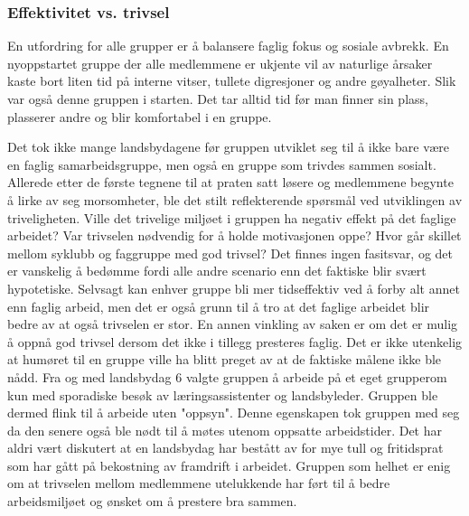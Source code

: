 \subsubsection{Effektivitet vs. trivsel}
En utfordring for alle grupper er å balansere faglig fokus og sosiale avbrekk.
En nyoppstartet gruppe der alle medlemmene er ukjente vil av naturlige årsaker kaste bort liten tid på interne vitser, tullete digresjoner og andre gøyalheter.
Slik var også denne gruppen i starten. Det tar alltid tid før man finner sin plass, plasserer andre og blir komfortabel i en gruppe. 

Det tok ikke mange landsbydagene før gruppen utviklet seg til å ikke bare være en faglig samarbeidsgruppe, men også en gruppe som trivdes sammen sosialt. 
Allerede etter de første tegnene til at praten satt løsere og medlemmene begynte å lirke av seg morsomheter, ble det stilt reflekterende spørsmål ved utviklingen av triveligheten.
Ville det trivelige miljøet i gruppen ha negativ effekt på det faglige arbeidet?
Var trivselen nødvendig for å holde motivasjonen oppe? 
Hvor går skillet mellom syklubb og faggruppe med god trivsel?
Det finnes ingen fasitsvar, og det er vanskelig å bedømme fordi alle andre scenario enn det faktiske blir svært hypotetiske.
Selvsagt kan enhver gruppe bli mer tidseffektiv ved å forby alt annet enn faglig arbeid, men det er også grunn til å tro at det faglige arbeidet blir bedre av at også trivselen er stor.
En annen vinkling av saken er om det er mulig å oppnå god trivsel dersom det ikke i tillegg presteres faglig.
Det er ikke utenkelig at humøret til en gruppe ville ha blitt preget av at de faktiske målene ikke ble nådd.
Fra og med landsbydag 6 valgte gruppen å arbeide på et eget grupperom kun med sporadiske besøk av læringsassistenter og landsbyleder.
Gruppen ble dermed flink til å arbeide uten "oppsyn".
Denne egenskapen tok gruppen med seg da den senere også ble nødt til å møtes utenom oppsatte arbeidstider.
Det har aldri vært diskutert at en landsbydag har bestått av for mye tull og fritidsprat som har gått på bekostning av framdrift i arbeidet.
Gruppen som helhet er enig om at trivselen mellom medlemmene utelukkende har ført til å bedre arbeidsmiljøet og ønsket om å prestere bra sammen.

